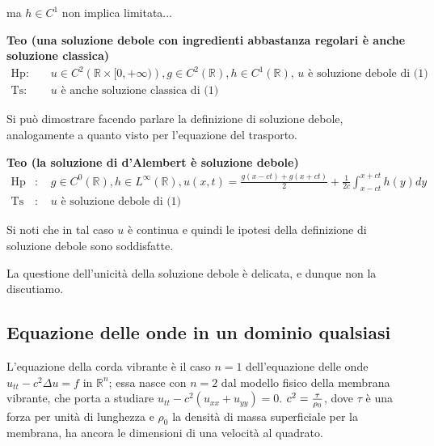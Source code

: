 \documentclass{article}
\begin{document}
ma $h\in C^{1}$ non implica limitata...

\textbf{Teo (una soluzione debole con ingredienti abbastanza regolari \`{e}
anche soluzione classica)}%
\begin{eqnarray*}
\text{Hp}\text{: } &&u\in C^{2}\left( 
\mathbb{R}
\times \lbrack 0,+\infty )\right) ,g\in C^{2}\left( 
\mathbb{R}
\right) ,h\in C^{1}\left( 
\mathbb{R}
\right) \text{, }u\text{ \`{e} soluzione debole di (1)} \\
\text{Ts}\text{: } &&u\text{ \`{e} anche soluzione classica di (1)}
\end{eqnarray*}

Si pu\`{o} dimostrare facendo parlare la definizione di soluzione debole,
analogamente a quanto visto per l'equazione del trasporto.

\textbf{Teo (la soluzione di d'Alembert \`{e} soluzione debole)}%
\begin{eqnarray*}
\text{Hp} &\text{: }&g\in C^{0}\left( 
\mathbb{R}
\right) ,h\in L^{\infty }\left( 
\mathbb{R}
\right) ,u\left( x,t\right) =\frac{g\left( x-ct\right) +g\left( x+ct\right) 
}{2}+\frac{1}{2c}\int_{x-ct}^{x+ct}h\left( y\right) dy \\
\text{Ts} &\text{: }&u\text{ \`{e} soluzione debole di (1)}
\end{eqnarray*}

Si noti che in tal caso $u$ \`{e} continua e quindi le ipotesi della
definizione di soluzione debole sono soddisfatte.

La questione dell'unicit\`{a} della soluzione debole \`{e} delicata, e
dunque non la discutiamo.

\subsection{Equazione delle onde in un dominio qualsiasi}

L'equazione della corda vibrante \`{e} il caso $n=1$ dell'equazione delle
onde $u_{tt}-c^{2}\Delta u=f$ in $%
\mathbb{R}
^{n}$; essa nasce con $n=2$ dal modello fisico della membrana vibrante, che
porta a studiare $u_{tt}-c^{2}\left( u_{xx}+u_{yy}\right) =0$. $c^{2}=\frac{%
\tau }{\rho _{0}}$, dove $\tau $ \`{e} una forza per unit\`{a} di lunghezza
e $\rho _{0}$ la densit\`{a} di massa superficiale per la membrana, ha
ancora le dimensioni di una velocit\`{a} al quadrato.
\end{document}

